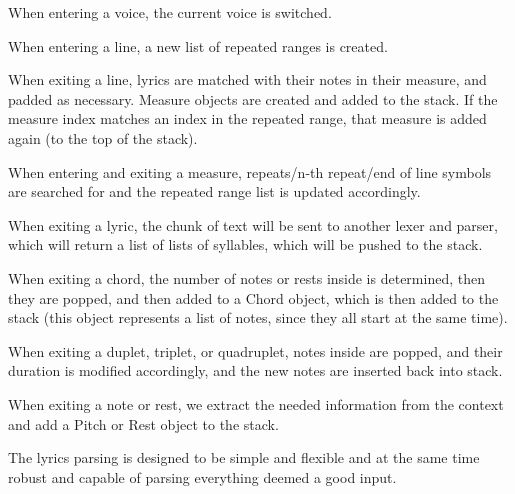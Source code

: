 \documentclass[12pt]{book}
\begin{document}
\begin{itemize}
When entering a voice, the current voice is switched.

When entering a line, a new list of repeated ranges is created.

When exiting a line, lyrics are matched with their notes in their measure, and padded as necessary. Measure objects are created and added to the stack. If the measure index matches an index in the repeated range, that measure is added again (to the top of the stack). 

When entering and exiting a measure, repeats/n-th repeat/end of line symbols are searched for and the repeated range list is updated accordingly.

When exiting a lyric, the chunk of text will be sent to another lexer and parser, which will return a list of lists of syllables, which will be pushed to the stack.

When exiting a chord, the number of notes or rests inside is determined, then they are popped, and then added to a Chord object, which is then added to the stack (this object represents a list of notes, since they all start at the same time).

When exiting a duplet, triplet, or quadruplet, notes inside are popped, and their duration is modified accordingly, and the new notes are inserted back into stack.

When exiting a note or rest, we extract the needed information from the context and add a Pitch or Rest object to the stack. 


\end{itemize}

\bigskip


\bigskip

The lyrics parsing is designed to be simple and flexible and at the same time robust and capable of parsing everything deemed a good input. 
\end{document}
